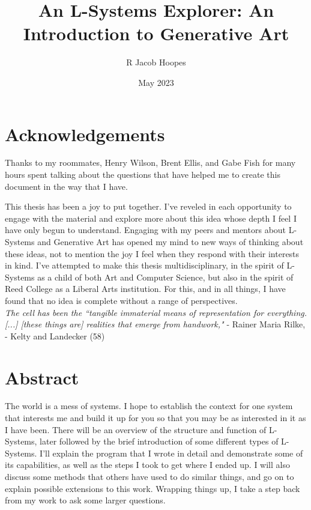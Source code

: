 \documentclass[12pt,twoside]{reedthesis}
\title{An L-Systems Explorer: An Introduction to Generative Art} %
\author{R Jacob Hoopes}
\date{May 2023}
\begin{document}
  \maketitle
  \frontmatter %
  \pagestyle{empty} %

    \chapter*{Acknowledgements}
	Thanks to my roommates, Henry Wilson, Brent Ellis, and Gabe Fish for many hours spent talking about the questions that have helped me to create this document in the way that I have.
	
	This thesis has been a joy to put together. I've reveled in each opportunity to engage with the material and explore more about this idea whose depth I feel I have only begun to understand. Engaging with my peers and mentors about L-Systems and Generative Art has opened my mind to new ways of thinking about these ideas, not to mention the joy I feel when they respond with their interests in kind. I've attempted to make this thesis multidisciplinary, in the spirit of L-Systems as a child of both Art and Computer Science, but also in the spirit of Reed College as a Liberal Arts institution. For this, and in all things, I have found that no idea is complete without a range of perspectives.\\
	
	\textit{The cell has been the ``tangible immaterial means of representation for everything. [...] [these things are] realities that emerge from handwork,"} - Rainer Maria Rilke, - Kelty and Landecker (58)


    \tableofcontents

\chapter*{Abstract}
	The world is a mess of systems. I hope to establish the context for one system that interests me and build it up for you so that you may be as interested in it as I have been. There will be an overview of the structure and function of L-Systems, later followed by the brief introduction of some different types of L-Systems. I'll explain the program that I wrote in detail and demonstrate some of its capabilities, as well as the steps I took to get where I ended up. I will also discuss some methods that others have used to do similar things, and go on to explain possible extensions to this work. Wrapping things up, I take a step back from my work to ask some larger questions.
	
\end{document}
